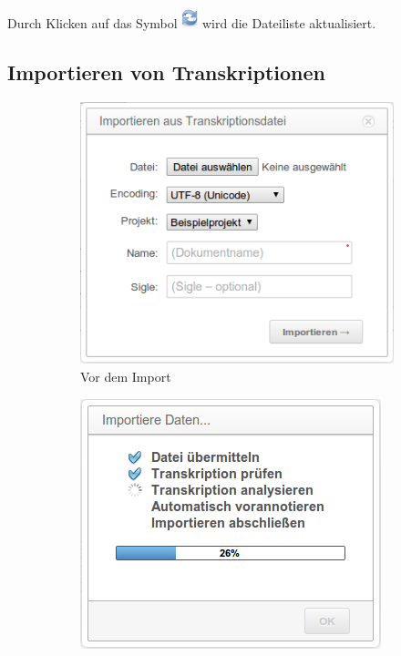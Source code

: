 \documentclass[11pt,a4paper,parskip=half]{scrartcl}
\begin{document}
Durch Klicken auf das
Symbol \includegraphics[height=0.9\baselineskip]{img/view-refresh.png}
wird die Dateiliste aktualisiert.


\subsection{Importieren von Transkriptionen}
\label{sec:datei-import}

\begin{figure}
  \centering
  \begin{subfigure}[b]{0.45\textwidth}
    \centering
    \includegraphics[width=\textwidth]{img/import-trans.png}
    \caption{Vor dem Import}
    \label{fig:import-dialog}
  \end{subfigure}
  \hfill
  \begin{subfigure}[b]{0.45\textwidth}
    \centering
    \includegraphics[width=\textwidth]{img/import-trans-progress.png}

\end{subfigure}
\end{figure}
\end{document}
